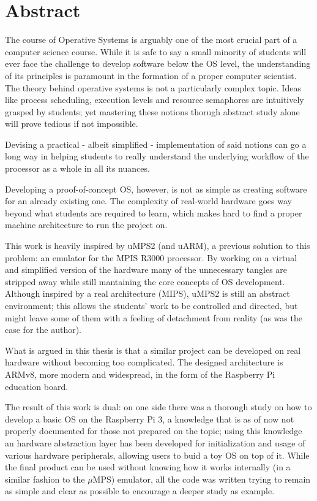 \documentclass[12pt,a4paper,openright,twoside]{report}
\begin{document}
\chapter*{Abstract}                 %
The course of Operative Systems is arguably one of the most crucial part of 
a computer science course. While it is safe to say a small minority of students
will ever face the challenge to develop software below the OS level, the 
understanding of its principles is paramount in the formation of a proper computer
scientist.
The theory behind operative systems is not a particularly complex topic. Ideas 
like process scheduling, execution levels and resource semaphores are intuitively
grasped by students; yet mastering these notions thorugh abstract study alone
will prove tedious if not impossible. 

Devising a practical - albeit simplified - implementation of said notions can
go a long way in helping students to really understand the underlying workflow
of the processor as a whole in all its nuances. 

Developing a proof-of-concept OS, however, is not as simple as creating software for
an already existing one. The complexity of real-world hardware
 goes way beyond what students are required to learn, which makes hard to
 find a proper machine architecture to run the project on.

This work is heavily inspired by uMPS2 (and uARM), a previous solution to this problem:
 an emulator for the MPIS R3000 processor. By working on a virtual and simplified
 version of the hardware many of the unnecessary tangles are stripped away while
 still mantaining the core concepts of OS development.
Although inspired by a real architecture (MIPS), uMPS2 is still an abstract 
environment; this allows the students' work to be controlled and directed,
 but might leave some of them with a feeling of detachment from reality
 (as was the case for the author).

What is argued in this thesis is that a similar project can be developed
on real hardware without becoming too complicated. The designed architecture
is ARMv8, more modern and widespread, in the form of the Raspberry Pi education
board.

The result of this work is dual: on one side there was a thorough study on
how to develop a basic OS on the Raspberry Pi 3, a knowledge that is
as of now not properly documented for those not prepared on the topic; using
this knowledge an hardware abstraction layer has been developed for 
initialization and usage of various hardware peripherals, allowing users
to buid a toy OS on top of it.
While the final product can be used without knowing how it works internally 
(in a similar fashion to the $\mu$MPS) emulator, all the code was written 
trying to remain as simple and clear as possible to encourage a deeper study
as example.
\end{document}
